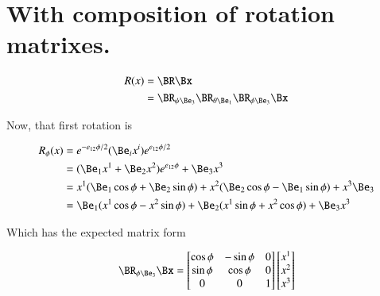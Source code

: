 \documentclass{article}
\begin{document}
\section{ With composition of rotation matrixes. }

\begin{align*}
R(x) &= \BR \Bx \\
&= 
\BR_{\psi \Be_3}
\BR_{\theta \Be_1}
\BR_{\phi \Be_3} \Bx \\
\end{align*}

Now, that first rotation is

\begin{align*}
R_\phi(x)
&= e^{-e_{12}\phi/2} (\Be_i x^i) e^{e_{12}\phi/2} \\
&= ( \Be_1 x^1 +\Be_2 x^2) e^{e_{12}\phi} + \Be_3 x^3 \\
&= 
 x^1 ( \Be_1 \cos\phi +\Be_2 \sin\phi )
+x^2 ( \Be_2 \cos\phi -\Be_1 \sin\phi )
+x^3 \Be_3 \\
&= 
 \Be_1 ( x^1 \cos\phi - x^2 \sin\phi )
+\Be_2 ( x^1 \sin\phi + x^2 \cos\phi )
+\Be_3 x^3 \\
\end{align*}

Which has the expected matrix form

\begin{align*}
\BR_{\phi \Be_3} \Bx =
\begin{bmatrix}
\cos\phi & - \sin\phi & 0 \\
\sin\phi & \cos\phi & 0 \\
0 & 0 & 1 \\
\end{bmatrix}
\begin{bmatrix}
x^1 \\
x^2 \\
x^3 \\
\end{bmatrix}
\end{align*}
\end{document}
